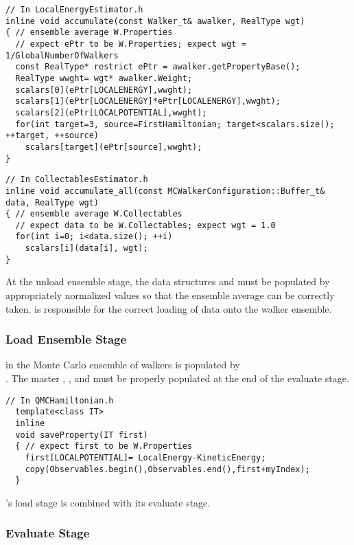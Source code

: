 \begin{lstlisting}
// In LocalEnergyEstimator.h
inline void accumulate(const Walker_t& awalker, RealType wgt)
{ // ensemble average W.Properties
  // expect ePtr to be W.Properties; expect wgt = 1/GlobalNumberOfWalkers
  const RealType* restrict ePtr = awalker.getPropertyBase();
  RealType wwght= wgt* awalker.Weight;
  scalars[0](ePtr[LOCALENERGY],wwght);
  scalars[1](ePtr[LOCALENERGY]*ePtr[LOCALENERGY],wwght);
  scalars[2](ePtr[LOCALPOTENTIAL],wwght);
  for(int target=3, source=FirstHamiltonian; target<scalars.size(); ++target, ++source)
    scalars[target](ePtr[source],wwght);
}
\end{lstlisting}

\begin{lstlisting}
// In CollectablesEstimator.h
inline void accumulate_all(const MCWalkerConfiguration::Buffer_t& data, RealType wgt)
{ // ensemble average W.Collectables
  // expect data to be W.Collectables; expect wgt = 1.0
  for(int i=0; i<data.size(); ++i)
    scalars[i](data[i], wgt);
}
\end{lstlisting}

At the unload ensemble stage, the data structures  and  must be populated by appropriately normalized values so that the ensemble average can be correctly taken.  is responsible for the correct loading of data onto the walker ensemble.

\subsubsection{Load Ensemble Stage}
 in the Monte Carlo ensemble of walkers  is populated by \\ . The master , , and  must be properly populated at the end of the evaluate stage.
\begin{lstlisting}
// In QMCHamiltonian.h
  template<class IT>
  inline
  void saveProperty(IT first)
  { // expect first to be W.Properties
    first[LOCALPOTENTIAL]= LocalEnergy-KineticEnergy;
    copy(Observables.begin(),Observables.end(),first+myIndex);
  }
\end{lstlisting}

's load stage is combined with its evaluate stage.

\subsubsection{Evaluate Stage}

